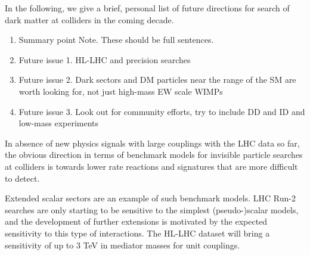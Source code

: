 In the following, we give a brief, personal list of future directions for search of dark matter at colliders in the coming decade. 

\begin{issues}
\begin{enumerate}
\item Summary point Note. These should be full sentences.
\item Future issue 1. HL-LHC and precision searches
\item Future issue 2. Dark sectors and DM particles near the range of the SM are worth looking for, not just high-mass EW scale WIMPs
\item Future issue 3. Look out for community efforts, try to include DD and ID and low-mass experiments 
\end{enumerate}
\end{issues}





In absence of new physics signals with large couplings with the LHC data so far, the obvious direction 
in terms of benchmark models for invisible particle searches at colliders is towards lower rate reactions
and signatures that are more difficult to detect. 

Extended scalar sectors are an example of such benchmark models. LHC Run-2 searches are only starting to be sensitive to the simplest (pseudo-)scalar models, and the development of further extensions is motivated by the expected sensitivity to this type of interactions. The HL-LHC dataset will bring a sensitivity of up to 3 TeV in mediator masses for unit couplings. 

